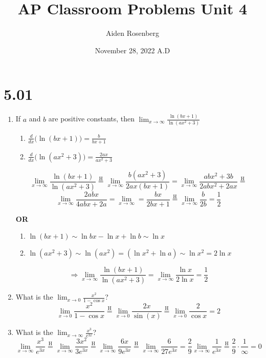 \documentclass[12pt]{article}
\title{AP Classroom Problems Unit 4}
\author{Aiden Rosenberg}
\date{November 28, 2022 A.D}
\begin{document}
\newcommand*\Heq{\overset{\mathrm{H}}{=}}

\maketitle

\section*{5.01}
\begin{enumerate}
    \item If $a$ and $b$ are positive constants, then $\lim_{x\to\infty}\frac{\ln(bx+1)}{\ln(ax^2+3)}$
    \begin{enumerate}
        \item $\frac{d}{dx}\bigg(\ln(bx+1)\bigg) = \frac{b}{bx+1}$
         \item $\frac{d}{dx}\bigg(\ln(ax^2+3)\bigg) = \frac{2ax}{ax^2+3}$ 
    \end{enumerate}
    
    $$\lim_{x\to\infty}\frac{\ln(bx+1)}{\ln(ax^2+3)} \Heq \lim_{x\to\infty} \frac{b(ax^2+3)}{2ax(bx+1)} = \lim_{x\to\infty} \frac{abx^2+3b}{2abx^2+2ax} \Heq$$ 
    $$\lim_{x\to\infty} \frac{2abx}{4abx+2a} = \lim_{x\to\infty} =\frac{bx}{2bx+1} \Heq \lim_{x\to\infty} \frac{b}{2b} = \boxed{\frac{1}{2}}$$
    \begin{center}
        \textbf{OR}
    \end{center}
    \begin{enumerate}
        \item  $\ln(bx+1) \sim \ln bx - \ln x + \ln b \sim \ln x$
        \item $\ln(ax^2+3)\sim \ln(ax^2)=(\ln x^2+\ln a)\sim \ln x^2 = 2\ln x$
    \end{enumerate}
   
   $$\Longrightarrow \lim_{x\to\infty}\frac{\ln(bx+1)}{\ln(ax^2+3)} = \lim_{x\to\infty} \frac{\ln x}{2\ln x} = \boxed{\frac{1}{2}}$$
    
    
    \item What is the $\lim_{x\to0}\frac{x^2}{1-\cos x}$?
   $$\lim_{x\to0}\frac{x^2}{1-\cos x} \Heq \lim_{x\to0} \frac{2x}{\sin(x)} \Heq \lim_{x\to0} \frac{2}{\cos x}= \boxed{2}$$
   
    \item What is the $\lim_{x\to\infty}\frac{x^3}{e^{3x}}$?
$$\lim_{x\to\infty}\frac{x^3}{e^{3x}} \Heq\lim_{x\to\infty} \frac{3x^2}{3e^{3x}}\Heq\lim_{x\to\infty} \frac{6x}{9e^{3x}} \Heq\lim_{x\to\infty}\frac{6}{27e^{3x}}  =  \frac{2}{9}\lim_{x\to\infty}\frac{1}{e^{3x}} \Heq \frac{2}{9} \cdot \frac{1}{\infty} = \boxed{0}$$
    

\end{enumerate}
\end{document}
